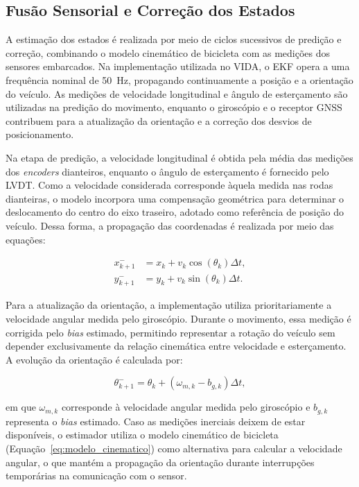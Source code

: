 \subsection{Fusão Sensorial e Correção dos Estados}
\label{subsec:fusao_sensorial}

A estimação dos estados é realizada por meio de ciclos sucessivos de predição e correção, combinando o modelo cinemático de bicicleta com as medições dos sensores embarcados. Na implementação utilizada no VIDA, o EKF opera a uma frequência nominal de 50~Hz, propagando continuamente a posição e a orientação do veículo. As medições de velocidade longitudinal e ângulo de esterçamento são utilizadas na predição do movimento, enquanto o giroscópio e o receptor GNSS contribuem para a atualização da orientação e a correção dos desvios de posicionamento.

Na etapa de predição, a velocidade longitudinal é obtida pela média das medições dos \textit{encoders} dianteiros, enquanto o ângulo de esterçamento é fornecido pelo LVDT. Como a velocidade considerada corresponde àquela medida nas rodas dianteiras, o modelo incorpora uma compensação geométrica para determinar o deslocamento do centro do eixo traseiro, adotado como referência de posição do veículo. Dessa forma, a propagação das coordenadas é realizada por meio das equações:

\begin{equation}
\begin{aligned}
x_{k+1}^{-} &= x_k + v_k \cos(\theta_k)\Delta t, \\
y_{k+1}^{-} &= y_k + v_k \sin(\theta_k)\Delta t.
\end{aligned}
\label{eq:predicao_posicao_ekf}
\end{equation}

Para a atualização da orientação, a implementação utiliza prioritariamente a velocidade angular medida pelo giroscópio. Durante o movimento, essa medição é corrigida pelo \textit{bias} estimado, permitindo representar a rotação do veículo sem depender exclusivamente da relação cinemática entre velocidade e esterçamento. A evolução da orientação é calculada por:

\begin{equation}
\theta_{k+1}^{-} = \theta_k + (\omega_{m,k} - b_{g,k})\Delta t,
\label{eq:predicao_orientacao_ekf}
\end{equation}

em que $\omega_{m,k}$ corresponde à velocidade angular medida pelo giroscópio e $b_{g,k}$ representa o \textit{bias} estimado. Caso as medições inerciais deixem de estar disponíveis, o estimador utiliza o modelo cinemático de bicicleta (Equação~\ref{eq:modelo_cinematico}) como alternativa para calcular a velocidade angular, o que mantém a propagação da orientação durante interrupções temporárias na
comunicação com o sensor.

